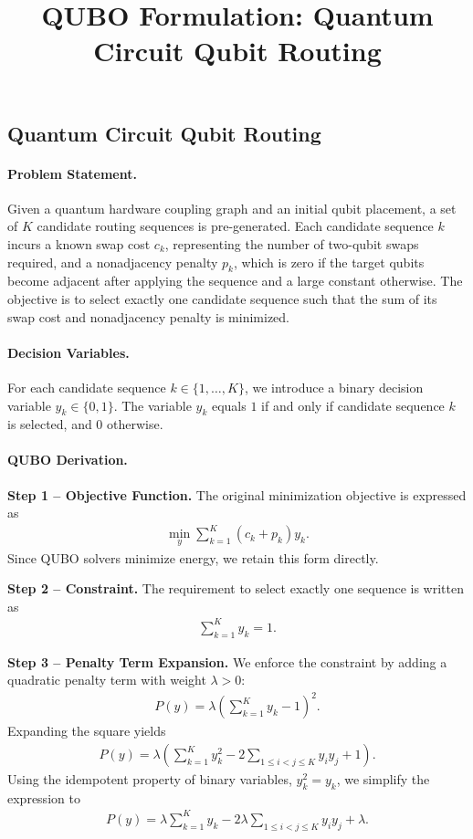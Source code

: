 \documentclass[12pt]{article}
\title{QUBO Formulation: Quantum Circuit Qubit Routing}
\date{}
\begin{document}
\maketitle

\subsection*{Quantum Circuit Qubit Routing}

\paragraph{Problem Statement.}
Given a quantum hardware coupling graph and an initial qubit placement, a set of $K$ candidate routing sequences is pre-generated. Each candidate sequence $k$ incurs a known swap cost $c_k$, representing the number of two-qubit swaps required, and a nonadjacency penalty $p_k$, which is zero if the target qubits become adjacent after applying the sequence and a large constant otherwise. The objective is to select exactly one candidate sequence such that the sum of its swap cost and nonadjacency penalty is minimized.

\paragraph{Decision Variables.}
For each candidate sequence $k \in \{1, \dots, K\}$, we introduce a binary decision variable $y_k \in \{0,1\}$. The variable $y_k$ equals $1$ if and only if candidate sequence $k$ is selected, and $0$ otherwise.

\paragraph{QUBO Derivation.}
\textbf{Step 1 -- Objective Function.} The original minimization objective is expressed as
\begin{align}
\min_{y} \sum_{k=1}^{K} (c_k + p_k) y_k.
\end{align}
Since QUBO solvers minimize energy, we retain this form directly.

\textbf{Step 2 -- Constraint.} The requirement to select exactly one sequence is written as
\begin{align}
\sum_{k=1}^{K} y_k = 1.
\end{align}

\textbf{Step 3 -- Penalty Term Expansion.} We enforce the constraint by adding a quadratic penalty term with weight $\lambda > 0$:
\begin{align}
P(y) = \lambda \left( \sum_{k=1}^{K} y_k - 1 \right)^2.
\end{align}
Expanding the square yields
\begin{align}
P(y) = \lambda \left( \sum_{k=1}^{K} y_k^2 - 2 \sum_{1 \le i < j \le K} y_i y_j + 1 \right).
\end{align}
Using the idempotent property of binary variables, $y_k^2 = y_k$, we simplify the expression to
\begin{align}
P(y) = \lambda \sum_{k=1}^{K} y_k - 2\lambda \sum_{1 \le i < j \le K} y_i y_j + \lambda.
\end{align}
\end{document}
